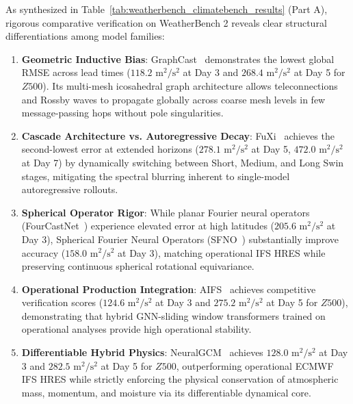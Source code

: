 As synthesized in Table~\ref{tab:weatherbench_climatebench_results} (Part A), rigorous comparative verification on WeatherBench 2 reveals clear structural differentiations among model families:
\begin{enumerate}
    \item \textbf{Geometric Inductive Bias}: GraphCast~\cite{lam2023graphcast} demonstrates the lowest global RMSE across lead times ($118.2\text{ m}^2/\text{s}^2$ at Day 3 and $268.4\text{ m}^2/\text{s}^2$ at Day 5 for $Z500$). Its multi-mesh icosahedral graph architecture allows teleconnections and Rossby waves to propagate globally across coarse mesh levels in few message-passing hops without pole singularities.
    \item \textbf{Cascade Architecture vs. Autoregressive Decay}: FuXi~\cite{chen2023fuxi} achieves the second-lowest error at extended horizons ($278.1\text{ m}^2/\text{s}^2$ at Day 5, $472.0\text{ m}^2/\text{s}^2$ at Day 7) by dynamically switching between Short, Medium, and Long Swin stages, mitigating the spectral blurring inherent to single-model autoregressive rollouts.
    \item \textbf{Spherical Operator Rigor}: While planar Fourier neural operators (FourCastNet~\cite{pathak2022fourcastnet}) experience elevated error at high latitudes ($205.6\text{ m}^2/\text{s}^2$ at Day 3), Spherical Fourier Neural Operators (SFNO~\cite{bonev2023sfno}) substantially improve accuracy ($158.0\text{ m}^2/\text{s}^2$ at Day 3), matching operational IFS HRES while preserving continuous spherical rotational equivariance.
    \item \textbf{Operational Production Integration}: AIFS~\cite{lang2024aifs} achieves competitive verification scores ($124.6\text{ m}^2/\text{s}^2$ at Day 3 and $275.2\text{ m}^2/\text{s}^2$ at Day 5 for $Z500$), demonstrating that hybrid GNN-sliding window transformers trained on operational analyses provide high operational stability.
    \item \textbf{Differentiable Hybrid Physics}: NeuralGCM~\cite{kochkov2024neuralgcm} achieves $128.0\text{ m}^2/\text{s}^2$ at Day 3 and $282.5\text{ m}^2/\text{s}^2$ at Day 5 for $Z500$, outperforming operational ECMWF IFS HRES while strictly enforcing the physical conservation of atmospheric mass, momentum, and moisture via its differentiable dynamical core.
\end{enumerate}

